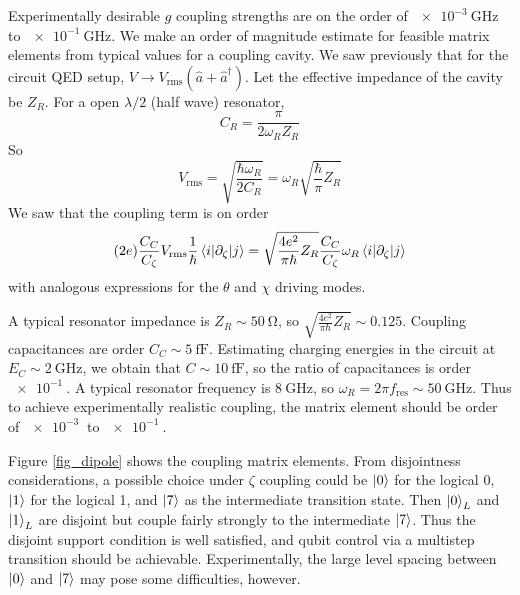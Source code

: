 \documentclass[11pt]{article}
\begin{document}
Experimentally desirable $g$ coupling strengths are on the order of $\SI{e-3}{\giga\hertz}$ to $\SI{e-1}{\giga\hertz}$. We make an order of magnitude estimate for feasible matrix elements from typical values for a coupling cavity. We saw previously that for the circuit QED setup, $V \rightarrow V_\text{rms} (\hat{a} + \hat{a}^\dagger)$. Let the effective impedance of the cavity be $Z_R$. For a open $\lambda/2$ (half wave) resonator,
\begin{equation}
C_R = \frac{\pi}{2 \omega_R Z_R}
\end{equation}
So
\begin{equation}
V_\text{rms} = \sqrt{\frac{\hbar \omega_R}{2 C_R}} = \omega_R \sqrt{\frac{\hbar}{\pi} Z_R}
\end{equation}
We saw that the coupling term is on order
\begin{equation}
(2e) \frac{C_C}{C_\zeta} V_\text{rms} \frac{1}{\hbar} \matrixel{i}{\partial_\zeta}{j}
= \sqrt{\frac{4e^2}{\pi \hbar} Z_R} \frac{C_C}{C_\zeta} \omega_R \matrixel{i}{\partial_\zeta}{j}
\end{equation}
with analogous expressions for the $\theta$ and $\chi$ driving modes.

A typical resonator impedance is $Z_R \sim \SI{50}{\ohm}$, so $\sqrt{\frac{4e^2}{\pi \hbar} Z_R} \sim 0.125$. Coupling capacitances are order $C_C \sim \SI{5}{\femto\farad}$. Estimating charging energies in the circuit at $E_C \sim \SI{2}{\giga\hertz}$, we obtain that $C \sim \SI{10}{\femto\farad}$, so the ratio of capacitances is order $\SI{e-1}{}$. A typical resonator frequency is $\SI{8}{\giga\hertz}$, so $\omega_R = 2 \pi f_\text{res} \sim \SI{50}{\giga\hertz}$. Thus to achieve experimentally realistic coupling, the matrix element should be order of $\SI{e-3}{}$ to $\SI{e-1}{}$.

Figure \ref{fig_dipole} shows the coupling matrix elements. From disjointness considerations, a possible choice under $\zeta$ coupling could be $\ket{0}$ for the logical 0, $\ket{1}$ for the logical 1, and $\ket{7}$ as the intermediate transition state. Then $\ket{0}_L$ and $\ket{1}_L$ are disjoint but couple fairly strongly to the intermediate $\ket{7}$. Thus the disjoint support condition is well satisfied, and qubit control via a multistep transition should be achievable. Experimentally, the large level spacing between $\ket{0}$ and $\ket{7}$ may pose some difficulties, however.
\end{document}
